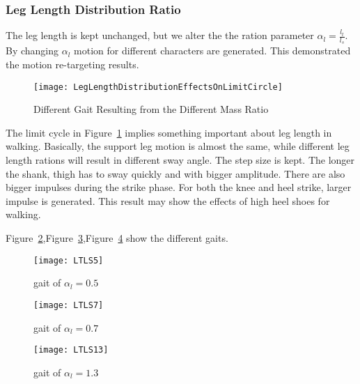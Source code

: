 \subsubsection*{Leg Length Distribution Ratio}
The leg length is kept unchanged, but we alter the the ration parameter $\alpha_l=\frac{l_t}{l_s}$.
By changing $\alpha_l$ motion for different characters are generated.
This demonstrated the motion re-targeting results.


\begin{figure}[!htbp]
  \begin{center}
      \texttt{[image: LegLengthDistributionEffectsOnLimitCircle]}
    \caption{Different Gait Resulting from the Different Mass Ratio}
    \label{fig:differentlr}
\end{center}
\end{figure}

The limit cycle in Figure~\ref{fig:differentlr} implies something important about leg length in walking.
Basically, the support leg motion is almost the same, while different leg length rations will result in different sway angle.
The step size is kept.
The longer the shank, thigh has to sway quickly and with bigger amplitude.
There are also bigger impulses during the strike phase. 
For both the knee and heel strike, larger impulse is generated.
This result may show the effects of high heel shoes for walking.

Figure~\ref{fig:lr1},Figure~\ref{fig:lr2},Figure~\ref{fig:lr3} show the different gaits.
\begin{figure}[!htbp]
  \begin{center}
      \texttt{[image: LTLS5]}
    \caption{gait of $\alpha_l=0.5$}
    \label{fig:lr1}
\end{center}
\end{figure}

\begin{figure}[!htbp]
  \begin{center}
      \texttt{[image: LTLS7]}
    \caption{gait of $\alpha_l=0.7$}
    \label{fig:lr2}
\end{center}
\end{figure}

\begin{figure}[!htbp]
  \begin{center}
      \texttt{[image: LTLS13]}
    \caption{gait of $\alpha_l=1.3$}
    \label{fig:lr3}
\end{center}
\end{figure}






